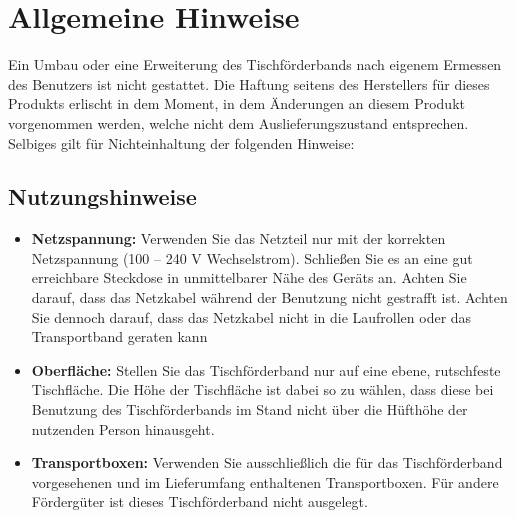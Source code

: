 %
%

\chapter{Allgemeine Hinweise}
Ein Umbau oder eine Erweiterung des Tischförderbands nach eigenem Ermessen des Benutzers ist nicht gestattet. Die Haftung seitens des Herstellers für dieses Produkts erlischt in dem Moment, in dem Änderungen an diesem Produkt vorgenommen werden, welche nicht dem Auslieferungszustand entsprechen. Selbiges gilt für Nichteinhaltung der folgenden Hinweise:

\section{Nutzungshinweise}
\begin{itemize}
	\item \textbf {Netzspannung:}	 
	Verwenden Sie das Netzteil nur mit der korrekten Netzspannung (100 – 240 V Wechselstrom). Schließen Sie es an eine gut erreichbare Steckdose in unmittelbarer Nähe des Geräts an. Achten Sie darauf, dass das Netzkabel während der Benutzung nicht gestrafft ist. Achten Sie dennoch darauf, dass das Netzkabel nicht in die Laufrollen oder das Transportband geraten kann  
	\item \textbf {Oberfläche:}
	Stellen Sie das Tischförderband nur auf eine ebene, rutschfeste Tischfläche. Die Höhe der Tischfläche ist dabei so zu wählen, dass diese bei Benutzung des Tischförderbands im Stand nicht über die Hüfthöhe der nutzenden Person hinausgeht.
	\item \textbf {Transportboxen:}
	Verwenden Sie ausschließlich die für das Tischförderband vorgesehenen und im Lieferumfang enthaltenen Transportboxen. Für andere Fördergüter ist dieses Tischförderband nicht ausgelegt.
	
\end{itemize}

